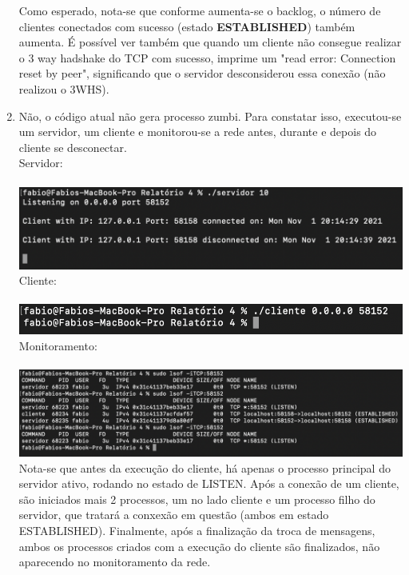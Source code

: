 \documentclass[12pt,a4paper]{report}
\begin{document}
\begin{enumerate}
    Como esperado, nota-se que conforme aumenta-se o backlog, o número de clientes conectados com sucesso (estado \textbf{ESTABLISHED}) também aumenta. É possível ver também que quando um cliente não consegue realizar o 3 way hadshake do TCP com sucesso, imprime um "read error: Connection reset by peer", significando que o servidor desconsiderou essa conexão (não realizou o 3WHS).
    
    \item Não, o código atual não gera processo zumbi. Para constatar isso, executou-se um servidor, um cliente e monitorou-se a rede antes, durante e depois do cliente se desconectar.
    \\
    Servidor:\\\\
    \includegraphics[width=1\textwidth]{images/ex5-servidor.png}
    Cliente:\\\\
    \includegraphics[width=1\textwidth]{images/ex5-cliente.png}
    Monitoramento:\\\\
    \includegraphics[width=1\textwidth]{images/ex5-lsof.png}
    Nota-se que antes da execução do cliente, há apenas o processo principal do servidor ativo, rodando no estado de LISTEN. Após a conexão de um cliente, são iniciados mais 2 processos, um no lado cliente e um processo filho do servidor, que tratará a conxexão em questão (ambos em estado ESTABLISHED). Finalmente, após a finalização da troca de mensagens, ambos os processos criados com a execução do cliente são finalizados, não aparecendo no monitoramento da rede.
\end{enumerate}
\end{document}
